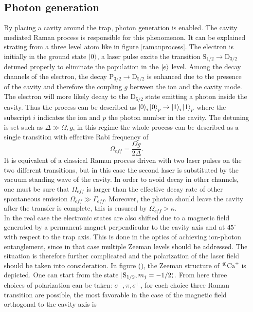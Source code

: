 \subsection{Photon generation}
\label{sec:ramanprocess}
By placing a cavity around the trap, photon generation is enabled. The cavity mediated Raman process is responsible for this phenomenon. It can be explained strating from a three level atom like in figure \ref{ramanprocess}. The electron is initially in the ground state $\ket{0}$, a laser pulse excite the transition $\text{S}_{1/2} \to \text{D}_{3/2}$ detuned properly to eliminate the population in the $\ket{e}$ level. Among the decay channels of the electron, the decay $\text{P}_{3/2} \to \text{D}_{5/2}$ is enhanced due to the presence of the cavity and therefore the coupling $g$ between the ion and the cavity mode. The electron will more likely decay
to the $\text{D}_{5/2}$ state emitting a photon inside the cavity. Thus the process can be described as $\ket{0}_i\ket{0}_p \to \ket{1}_i\ket{1}_p$ where the subscript $i$ indicates the ion and $p$ the photon number in the cavity. The detuning is set such as $\Delta \gg \Omega,g$, in this regime the whole process can be described as a single transition with effective Rabi frequency of \cite{helene}
\begin{equation}
\Omega_{eff} = \frac{\Omega g}{2\Delta}.
\end{equation}
It is equivalent of a classical Raman process driven with two laser pulses on the two different transitions, but in this case the second laser is substituted by the vacuum standing wave of the cavity. In order to avoid decay in other channels, one must be sure that $\Omega_{eff}$ is larger than the effective decay rate of other spontaneous emission $\Omega_{eff}\gg \Gamma_{eff}$. Moreover, the photon should leave the cavity after the transfer is complete, this is ensured by $\Omega_{eff} >\kappa$.\\
In the real case the electronic states are also shifted due to a magnetic field generated by a permanent magnet perpendicular to the cavity axis and at $45^{\circ}$ with respect to the trap axis. This is done in the optics of achieving ion-photon entanglement, since in that case multiple Zeeman levels should be addressed. The situation is therefore further complicated and the polarization of the laser field should be taken into consideration. In figure (), the Zeeman structure of $^{40}\text{Ca}^+$ is depicted. One can start from the state $\ket{\text{S}_{1/2},m_j = -1/2}$. From here three choices of polarization can be taken: $\sigma^-,\pi,\sigma^+$, for each choice three Raman transition are possible, the most favorable in the case of the magnetic field orthogonal to the cavity axis is \cite{stuteinterface}
